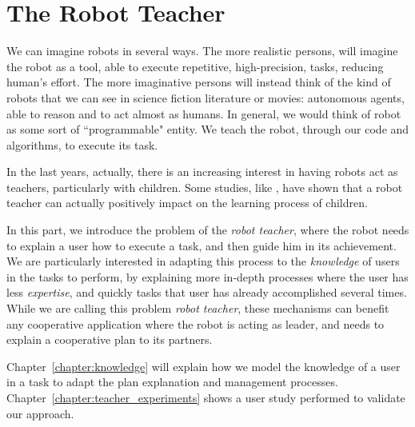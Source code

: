 \part{The Robot Teacher} %

\label{part:robot_teacher} %


We can imagine robots in several ways. The more realistic persons, will imagine the robot as a tool, able to execute repetitive, high-precision, tasks, reducing human's effort. The more imaginative persons will instead think of the kind of robots that we can see in science fiction literature or movies: autonomous agents, able to reason and to act almost as humans. In general, we would think of robot as some sort of ``programmable" entity. We teach the robot, through our code and algorithms, to execute its task.

In the last years, actually, there is an increasing interest in having robots act as teachers, particularly with children. Some studies, like \cite{movellan2009sociable}, have shown that a robot teacher can actually positively impact on the learning process of children.

In this part, we introduce the problem of the \textit{robot teacher}, where the robot needs to explain a user how to execute a task, and then guide him in its achievement. We are particularly interested in adapting this process to the \textit{knowledge} of users in the tasks to perform, by explaining more in-depth processes where the user has less \textit{expertise}, and quickly tasks that user has already accomplished several times. While we are calling this problem \textit{robot teacher}, these mechanisms can benefit any cooperative application where the robot is acting as leader, and needs to explain a cooperative plan to its partners.  

Chapter~\ref{chapter:knowledge} will explain how we model the knowledge of a user in a task to adapt the plan explanation and management processes. Chapter~\ref{chapter:teacher_experiments} shows a user study performed to validate our approach.

 
 
